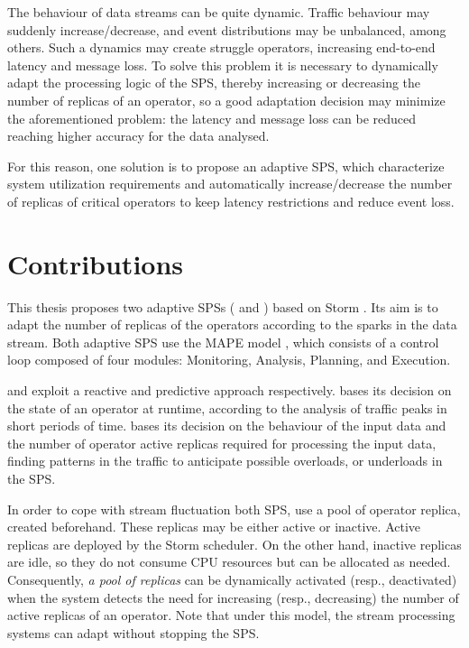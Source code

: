 The behaviour of data streams can be quite dynamic. Traffic behaviour may suddenly increase/decrease, and event distributions may be unbalanced, among others.  Such a dynamics may create struggle operators, increasing end-to-end latency and message loss. To solve this problem it is necessary to dynamically adapt the processing logic of the SPS, thereby increasing or decreasing the number of replicas of an operator, so a good adaptation decision may minimize the aforementioned problem: the latency and message loss can be reduced reaching higher accuracy for the data analysed.

For this reason, one solution is to propose an adaptive SPS, which characterize system utilization requirements and automatically increase/decrease the number of replicas of critical operators to keep latency restrictions and reduce event loss.

\section{Contributions}
\label{contributions}

This thesis proposes two adaptive SPSs (\rSPS{} and \pSPS{}) based on Storm \citep{toshniwal2014storm}. Its aim is to adapt the number of replicas of the operators according to the sparks in the data stream.
Both adaptive SPS use the MAPE model \citep{ibm2005architectural}, which consists of a control loop composed of four modules: Monitoring, Analysis, Planning, and Execution.

\rSPS{} and \pSPS{} exploit a reactive and predictive approach respectively. \rSPS{} bases its decision on the state of an operator at runtime, according to the analysis of traffic peaks in short periods of time.  \pSPS{} bases its decision on the behaviour of the input data and the number of operator active replicas required for processing the input data, finding patterns in the traffic to anticipate possible overloads, or underloads in the SPS.

In order to cope with stream fluctuation both SPS, use a pool of operator replica, created beforehand. These replicas may be either active or inactive. Active replicas are deployed by the Storm scheduler. On the other hand, inactive replicas are idle, so they do not consume CPU resources but can be allocated as needed. Consequently, \textit{a pool of replicas} can be dynamically activated (resp., deactivated) when the system detects the need for increasing (resp., decreasing) the number of active replicas of an operator. Note that under this model, the stream processing systems can adapt without stopping the SPS.

